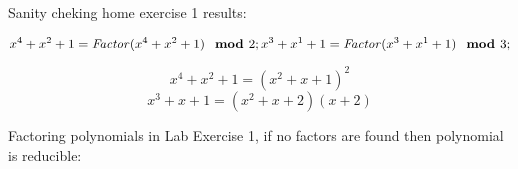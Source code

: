 \documentclass{article}
\begin{document}
\lstset{basicstyle=\ttfamily,breaklines=true,columns=flexible}
\pagestyle{empty}
\begin{Maple Normal}
Sanity cheking home exercise 1 results:
\end{Maple Normal}
\begin{Maple Normal}

\end{Maple Normal}
\begin{Maple Normal}
{$ \displaystyle x^{4}+x^{2}+1=\mathit{Factor} (x^{4}+x^{2}+1)\boldsymbol{\mod}2;
\\
 x^{3}+x^{1}+1=\mathit{Factor} (x^{3}+x^{1}+1)\boldsymbol{\mod}3; $}
\end{Maple Normal}
\begin{dmath*}
x^{4}+x^{2}+1=(x^{2}+x +1)^{2}
\end{dmath*}
\vspace{-\bigskipamount}
\begin{dmath}\label{(1)}
x^{3}+x +1=\left(x^{2}+x +2\right) \left(x +2\right)
\end{dmath}
\begin{Maple Normal}

\end{Maple Normal}
\begin{Maple Normal}

\end{Maple Normal}
\begin{Maple Normal}

\end{Maple Normal}
\begin{Maple Normal}
Factoring polynomials in Lab Exercise 1, if no factors are found then polynomial is reducible:
\end{Maple Normal}
\begin{Maple Normal}

\end{Maple Normal}
\end{document}
